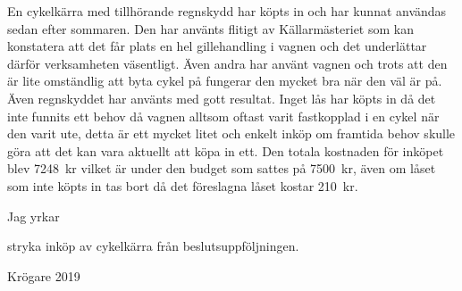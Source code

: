 \documentclass[../_main/handlingar.tex]{subfiles}
\begin{document}

    En cykelkärra med tillhörande regnskydd har köpts in och har kunnat användas sedan efter sommaren. Den har använts flitigt av Källarmästeriet som kan konstatera att det får plats en hel gillehandling i vagnen och det underlättar därför verksamheten väsentligt. Även andra har använt vagnen och trots att den är lite omständlig att byta cykel på fungerar den mycket bra när den väl är på. Även regnskyddet har använts med gott resultat. Inget lås har köpts in då det inte funnits ett behov då vagnen alltsom oftast varit fastkopplad i en cykel när den varit ute, detta är ett mycket litet och enkelt inköp om framtida behov skulle göra att det kan vara aktuellt att köpa in ett. Den totala kostnaden för inköpet blev \SI{7248}{kr} vilket är under den budget som sattes på \SI{7500}{kr}, även om låset som inte köpts in tas bort då det föreslagna låset kostar \SI{210}{kr}. 

    Jag yrkar 

\begin{attsatser}
    \att stryka inköp av cykelkärra från beslutsuppföljningen.
\end{attsatser}

\begin{signatures}{1}
    \signature{Davida Åström}{Krögare 2019}
\end{signatures}
\end{document}
